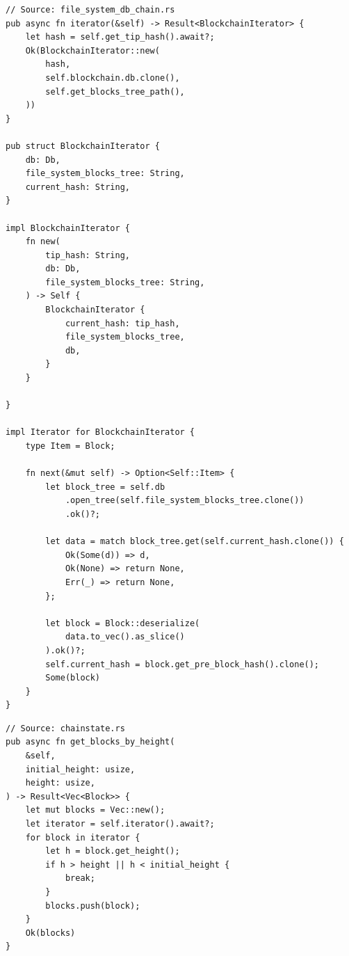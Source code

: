 \begin{listing}[htbp]
\caption{Iterator creation and stepping}
\label{lst:ch09-3-16}
\begin{verbatim}
// Source: file_system_db_chain.rs
pub async fn iterator(&self) -> Result<BlockchainIterator> {
    let hash = self.get_tip_hash().await?;
    Ok(BlockchainIterator::new(
        hash,
        self.blockchain.db.clone(),
        self.get_blocks_tree_path(),
    ))
}

pub struct BlockchainIterator {
    db: Db,
    file_system_blocks_tree: String,
    current_hash: String,
}

impl BlockchainIterator {
    fn new(
        tip_hash: String,
        db: Db,
        file_system_blocks_tree: String,
    ) -> Self {
        BlockchainIterator {
            current_hash: tip_hash,
            file_system_blocks_tree,
            db,
        }
    }

}

impl Iterator for BlockchainIterator {
    type Item = Block;

    fn next(&mut self) -> Option<Self::Item> {
        let block_tree = self.db
            .open_tree(self.file_system_blocks_tree.clone())
            .ok()?;

        let data = match block_tree.get(self.current_hash.clone()) {
            Ok(Some(d)) => d,
            Ok(None) => return None,
            Err(_) => return None,
        };

        let block = Block::deserialize(
            data.to_vec().as_slice()
        ).ok()?;
        self.current_hash = block.get_pre_block_hash().clone();
        Some(block)
    }
}
\end{verbatim}
\end{listing}

\begin{listing}[htbp]
\caption{Higher-level API: blocks by height range}
\label{lst:ch09-3-17}
\begin{verbatim}
// Source: chainstate.rs
pub async fn get_blocks_by_height(
    &self,
    initial_height: usize,
    height: usize,
) -> Result<Vec<Block>> {
    let mut blocks = Vec::new();
    let iterator = self.iterator().await?;
    for block in iterator {
        let h = block.get_height();
        if h > height || h < initial_height {
            break;
        }
        blocks.push(block);
    }
    Ok(blocks)
}
\end{verbatim}
\end{listing}

